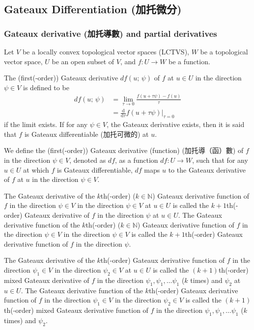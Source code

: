 \documentclass[a4paper,12pt]{report}
\begin{document}
\begin{itemize}
\begin{itemize}
\subsection{Gateaux Differentiation (加托微分)}
\subsubsection{Gateaux derivative (加托導數) and partial derivatives}
Let $V$ be a locally convex topological vector spaces (LCTVS), $W$ be a topological vector space, $U$ be an open subset of $V$, and $f\colon U\to W$ be a function.

The (first(-order)) Gateaux derivative $df(u;\,\psi)$ of $f$ at $u\in U$ in the direction $\psi \in V$ is defined to be
\[\begin{aligned}
df(u;\,\psi) &= \lim_{\tau\to 0}\frac{f(u+\tau \psi)-f(u)}{\tau}\\
&= \frac{\mathrm{d}}{\mathrm{d}\tau}f(u+\tau \psi)\big\vert_{\tau =0}
\end{aligned}\]
if the limit exists. If for any $\psi \in V$, the Gateaux derivative exists, then it is said that $f$ is Gateaux differentiable (加托可微的) at $u$.

We define the (first(-order)) Gateaux derivative (function) (加托導（函）數) of $f$ in the direction $\psi \in V$, denoted as $df$, as a function $df\colon U\to W$, such that for any $u\in U$ at which $f$ is Gateaux differentiable, $df$ maps $u$ to the Gateaux derivative of $f$ at $u$ in the direction $\psi \in V$.

The Gateaux derivative of the $k$th(-order) ($k\in\mathbb{N}$) Gateaux derivative function of $f$ in the direction $\psi \in V$ in the direction $\psi \in V$ at $u\in U$ is called the $k+1$th(-order) Gateaux derivative of $f$ in the direction $\psi$ at $u\in U$. The Gateaux derivative function of the $k$th(-order) ($k\in\mathbb{N}$) Gateaux derivative function of $f$ in the direction $\psi \in V$ in the direction $\psi \in V$ is called the $k+1$th(-order) Gateaux derivative function of $f$ in the direction $\psi$.

The Gateaux derivative of the $k$th(-order) Gateaux derivative function of $f$ in the direction $\psi_1\in V$ in the direction $\psi_2\in V$ at $u\in U$ is called the $(k+1)$th(-order) mixed Gateaux derivative of $f$ in the direction $\psi_1,\psi_1,\dots \psi_1$ ($k$ times) and $\psi_2$ at $u\in U$. The Gateaux derivative function of the $k$th(-order) Gateaux derivative function of $f$ in the direction $\psi_1\in V$ in the direction $\psi_2\in V$ is called the $(k+1)$th(-order) mixed Gateaux derivative function of $f$ in the direction $\psi_1,\psi_1,\dots \psi_1$ ($k$ times) and $\psi_2$.


\end{itemize}
\end{itemize}
\end{document}
